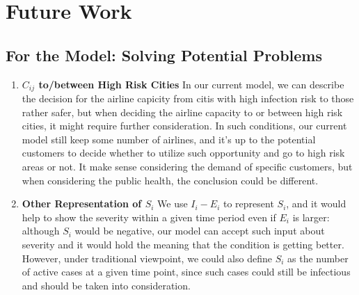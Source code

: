 \section{Future Work}

\subsection{For the Model: Solving Potential Problems}


\begin{enumerate}
    \item \textbf{$C_{ij}$ to/between High Risk Cities} In our current model, we can describe the decision for the airline capicity from citis with high infection risk to those rather safer, but when deciding the airline capacity to or between high risk cities, it might require further consideration. In such conditions, our current model still keep some number of airlines, and it's up to the potential customers to decide whether to utilize such opportunity and go to high risk areas or not. It make sense considering the demand of specific customers, but when considering the public health, the conclusion could be different. 
    \item \textbf{Other Representation of $S_{i}$} We use $I_i-E_i$ to represent $S_i$, and it would help to show the severity within a given time period even if $E_i$ is larger: although $S_i$ would be negative, our model can accept such input about severity and it would hold the meaning that the condition is getting better. However, under traditional viewpoint, we could also define $S_i$ as the number of active cases at a given time point, since such cases could still be infectious and should be taken into consideration.
\end{enumerate}


